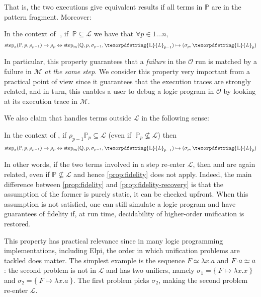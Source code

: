 \documentclass[sigconf,natbib=false,review]{acmart}
\newcommand{\appsep}{\ensuremath{\textcolor{lightgray}{\cdot}}}
\newcommand{\UnifRel}{\ensuremath{\simeq}}
\newcommand{\llambda}{\ensuremath{\mathcal{L}}\xspace}
\newcommand{\Fo}{\texorpdfstring{\ensuremath{\mathcal{O}}\xspace}{O}}
\newcommand{\Ho}{\texorpdfstring{\ensuremath{\mathcal{M}}\xspace}{M}}
\newcommand{\linkStore}{\texorpdfstring{\ensuremath{\mathbb{L}}\xspace}{L}}
\newcommand{\foUnifPb}{\ensuremath{\mathbb{P}}\xspace}
\newcommand{\hoUnifPb}{\ensuremath{\mathbb{Q}}\xspace}
\begin{document}
\noindent
That is, the two executions give equivalent results if all terms in
\foUnifPb are in the pattern fragment. Moreover:

\begin{proposition}\label{prop:fidelity}
In the context of$\;$ \hrun, if $~\foUnifPb \subseteq \llambda$ we have that
$\forall p \in 1 \ldots n,$
$$
\stepF{\foUnifPb}{p}{\rho_{p-1}}{\rho_p}
\Leftrightarrow
\stepH{\hoUnifPb}{p}{\sigma_{p-1}}{\linkStore_{p-1}}{\sigma_p}{\linkStore_p}
$$
\end{proposition}
\noindent
In particular, this property guarantees that a \emph{failure} in the \Fo{} run
is matched by a failure in \Ho{} \emph{at the same step}. We consider this
property very important from a practical point of view since it guarantees
that the execution traces are strongly related, and in turn, this enables a user
to debug a logic program in \Fo{} by looking at its execution trace in
\Ho{}.

We also claim that \hrun handles terms outside \llambda in the following sense:

\begin{proposition}\label{prop:fidelity-recovery} 
In the context of \hrun, if 
$\rho_{p-1} \foUnifPb_{p} \subseteq \llambda$ 
(even if $\;\foUnifPb_{p} \not\subseteq \llambda$)
then
$$
\stepF{\foUnifPb}{p}{\rho_{p-1}}{\rho_p} \Leftrightarrow
\stepH{\hoUnifPb}{p}{\sigma_{p-1}}{\linkStore_{p-1}}{\sigma_{p}}{\linkStore_p}
$$
\end{proposition}

\noindent
In other words, if the two terms involved in a step
re-enter \llambda, then \hstep and \fstep are again related, even if
$\foUnifPb \not\subseteq \llambda$ and hence \cref{prop:fidelity} does not apply.
Indeed, the main difference between \cref{prop:fidelity} and \cref{prop:fidelity-recovery}
is that the assumption of the former is purely static, it can be checked upfront. 
When this assumption is not satisfied, one can still simulate a logic program and
have guarantees of fidelity if, at run time, decidability of higher-order
unification is restored.

This property has practical relevance since in many logic programming
implementations, including Elpi, the order in which unification problems
are tackled does matter.
The simplest example is the sequence $F \UnifRel \lambda x.a$ and
$F \appsep a \UnifRel a$: the second problem is not in \llambda and has two
unifiers, namely $\sigma_1 = \{~ F \mapsto \lambda x.x ~\}$ and
$\sigma_2 = \{~ F \mapsto \lambda x.a ~\}$. The first problem picks $\sigma_2$,
making the second problem re-enter \llambda.
\end{document}
